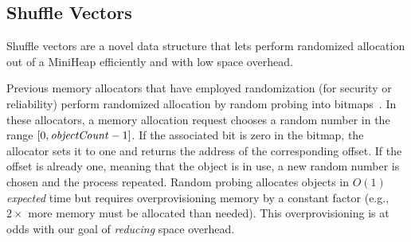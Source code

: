 \subsection{Shuffle Vectors}
\label{sec:shuffle-freelists}

Shuffle vectors are a novel data structure that lets \Mesh
perform randomized allocation out of a MiniHeap efficiently and
with low space overhead.

Previous memory allocators that have employed randomization (for
security or reliability) perform randomized allocation by random
probing into
bitmaps~\cite{1134000,Novark:2010:DSH:1866307.1866371}. In these
allocators, a memory allocation request chooses a random number in the
range $[0,\text{\textit{objectCount}}-1]$. If the associated bit is
zero in the bitmap, the allocator sets it to one and returns the
address of the corresponding offset. If the offset is already one,
meaning that the object is in use, a new random number is chosen and
the process repeated. Random probing allocates objects in $O(1)$
\emph{expected} time but requires overprovisioning memory by a
constant factor (e.g., $2\times$ more memory must be allocated than
needed). This overprovisioning is at odds with our goal of
\emph{reducing} space overhead.

